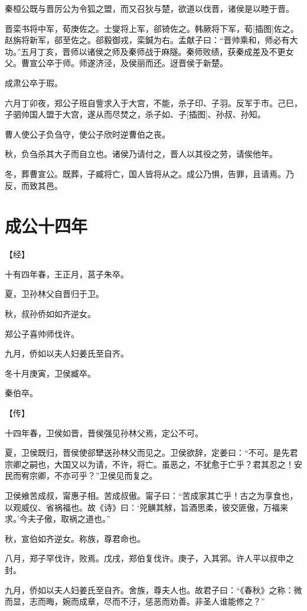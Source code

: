 \documentclass[a4paper,12pt,UTF8,twoside]{ctexbook}
\begin{document}
秦桓公既与晋厉公为令狐之盟，而又召狄与楚，欲道以伐晋，诸侯是以睦于晋。

晋栾书将中军，荀庚佐之。士燮将上军，郤锜佐之。韩厥将下军，荀[插图]佐之。赵旃将新军，郤至佐之。郤毅御戎，栾鍼为右。孟献子曰：“晋帅乘和，师必有大功。”五月丁亥，晋师以诸侯之师及秦师战于麻隧。秦师败绩，获秦成差及不更女父。曹宣公卒于师。师遂济泾，及侯丽而还。迓晋侯于新楚。

成肃公卒于瑕。

六月丁卯夜，郑公子班自訾求入于大宫，不能，杀子印、子羽。反军于市。己巳，子驷帅国人盟于大宫，遂从而尽焚之，杀子如、子[插图]、孙叔、孙知。

曹人使公子负刍守，使公子欣时逆曹伯之丧。

秋，负刍杀其大子而自立也。诸侯乃请付之，晋人以其役之劳，请俟他年。

冬，葬曹宣公。既葬，子臧将亡，国人皆将从之。成公乃惧，告罪，且请焉。乃反，而致其邑。

\section{成公十四年}



【经】

十有四年春，王正月，莒子朱卒。

夏，卫孙林父自晋归于卫。

秋，叔孙侨如如齐逆女。

郑公子喜帅师伐许。

九月，侨如以夫人妇姜氏至自齐。

冬十月庚寅，卫侯臧卒。

秦伯卒。

【传】

十四年春，卫侯如晋，晋侯强见孙林父焉，定公不可。

夏，卫侯既归，晋侯使郤犫送孙林父而见之。卫侯欲辞，定姜曰：“不可。是先君宗卿之嗣也，大国又以为请，不许，将亡。虽恶之，不犹愈于亡乎？君其忍之！安民而宥宗卿，不亦可乎？”卫侯见而复之。

卫侯飨苦成叔，甯惠子相。苦成叔傲。甯子曰：“苦成家其亡乎！古之为享食也，以观威仪、省祸福也。故《诗》曰：‘兕觵其觩，旨酒思柔，彼交匪傲，万福来求。’今夫子傲，取祸之道也。”

秋，宣伯如齐逆女。称族，尊君命也。

八月，郑子罕伐许，败焉。戊戌，郑伯复伐许。庚子，入其郛。许人平以叔申之封。

九月，侨如以夫人妇姜氏至自齐。舍族，尊夫人也。故君子曰：“《春秋》之称：微而显，志而晦，婉而成章，尽而不汙，惩恶而劝善。非圣人谁能修之？”
\end{document}
